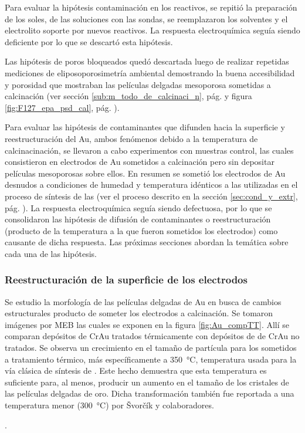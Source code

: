 {  			 Para evaluar la hipótesis contaminación en los reactivos, se repitió la preparación de los soles, de las soluciones con las sondas, se reemplazaron los solventes y el electrolito soporte por nuevos reactivos. La respuesta electroquímica seguía siendo deficiente por lo que se descartó esta hipótesis. 

  			 Las hipótesis de poros bloqueados quedó descartada luego de realizar repetidas mediciones de eliposoporosimetría ambiental demostrando la buena accesibilidad y porosidad que mostraban las películas delgadas mesoporosa sometidas a  calcinación (ver sección \ref{sub:m_todo_de_calcinaci_n}, pág. \pageref{sub:m_todo_de_calcinaci_n} y figura \ref{fig:F127_epa_psd_cal}, pág. \pageref{fig:F127_epa_psd_cal}).

  			 Para evaluar las hipótesis de contaminantes que difunden hacia la superficie y reestructuración del Au, ambos fenómenos debido a la temperatura de calcinacinación, se llevaron a cabo experimentos con muestras control, las cuales consistieron en electrodos de Au sometidos a calcinación pero sin depositar películas mesoporosas sobre ellos. En resumen se sometió los electrodos de Au desnudos a condiciones de humedad y temperatura idénticos a las utilizadas en el proceso de síntesis de las \pdm\space (ver el proceso descrito en la sección \ref{sec:cond_y_extr}, pág. \pageref{sec:cond_y_extr}). La respuesta electroquímica seguía siendo defectuosa, por lo que se consolidaron las hipótesis de difusión de contaminantes o reestructuración (producto de la temperatura a la que fueron sometidos los electrodos) como causante de dicha respuesta. Las próximas secciones abordan la temática sobre cada una de las hipótesis.

		\subsubsection{Reestructuración de la superficie de los electrodos}
			  		
			 Se estudio la morfología de las películas delgadas de Au en busca de cambios estructurales producto de someter los electrodos a calcinación. Se tomaron imágenes por MEB las cuales se exponen en la figura \ref{fig:Au_compTT}. Allí se comparan depósitos de Cr\textbar Au tratados térmicamente con depósitos de de Cr\textbar Au no tratados. Se observa un crecimiento en el tamaño de partícula para los sometidos a tratamiento térmico, más específicamente a \SI{350}{\celsius}, temperatura usada para la vía clásica de síntesis de \pdm. Este hecho demuestra que esta temperatura es suficiente para, al menos, producir un aumento en el tamaño de los cristales de las películas delgadas de oro. Dicha transformación también fue reportada a una temperatura menor (\SI{300}{\celsius})	 por \v{S}vor\v{c}\'ik y colaboradores.}\cite{Svorcik2010}. 

